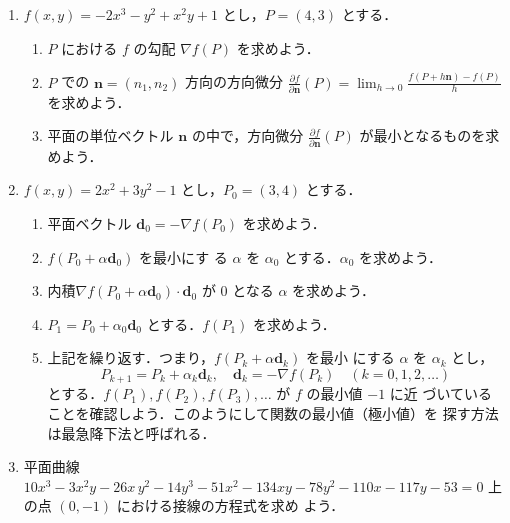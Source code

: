 \documentclass[11pt, uplatex, dvipdfmx, twoside]{jsarticle}
\newcommand{\ds}{\displaystyle}
\begin{document}
\begin{enumerate}[label=\arabic{section}.\arabic*]

  \setlength{\itemsep}{1zh}
  
\item $f(x,y) = -2x^3-y^2+x^2y+1$ とし，$\ds P=(4,3)$ とする．

  \vspace{1ex}

  \begin{enumerate}[label=(\arabic*)]
    \setlength{\itemsep}{1ex}
    
  \item $P$ における $f$ の勾配 $\nabla f(P)$ を求めよう．

  \item $P$ での $\bm{n} = (n_1, n_2)$ 方向の方向微分
    $\ds \frac{\partial f}{\partial \bm{n}}(P) = \lim_{h \to 0}
    \frac{f(P+h\bm{n}) - f(P)}{h}$ を求めよう．

  \item 平面の単位ベクトル $\bm{n}$ の中で，方向微分
    $\ds \frac{\partial f}{\partial \bm{n}}(P)$ が最小となるものを求めよう．
  \end{enumerate}

\item $f(x,y) = 2x^2+3y^2-1$ とし，$P_0=(3,4)$ とする．

  \vspace{1ex}
  
  \begin{enumerate}[label=(\arabic*)]
    \setlength{\itemsep}{1ex}
    
  \item 平面ベクトル $\bm{d}_0=-\nabla f(P_0)$ を求めよう．

  \item $f(P_0 + \alpha \bm{d}_0)$ を最小にす
    る $\alpha$ を $\alpha_0$ とする．$\alpha_0$ を求めよう．

  \item 内積$\nabla f\left(P_0 + \alpha \bm{d}_0 \right) \cdot
    \bm{d}_0$ が $0$ となる $\alpha$ を求めよう．

  \item $P_1 = P_0  + \alpha_0 \bm{d}_0$ とする．$f(P_1)$ を求めよう．

  \item 上記を繰り返す．つまり，$f(P_k + \alpha \bm{d}_k)$ を最小
    にする $\alpha$ を $\alpha_k$
    とし，
    \[
      P_{k+1} = P_{k} + \alpha_k \bm{d}_k, \quad \bm{d}_k = -\nabla f(P_k) \quad (k=0,1,2,\ldots)
    \]
    とする．$f(P_1), f(P_2), f(P_3), \ldots $ が $f$ の最小値 $-1$ に近
    づいていることを確認しよう．このようにして関数の最小値（極小値）を
    探す方法は最急降下法と呼ばれる．
  \end{enumerate}

\item 平面曲線
  $ 10 x^{3}-3 x^{2} y -26 x \,y^{2}-14 y^{3}-51 x^{2}-134 x y -78
  y^{2}-110 x -117 y -53=0$ 上の点 $(0,-1)$ における接線の方程式を求め
  よう．
  
\end{enumerate}
\end{document}
